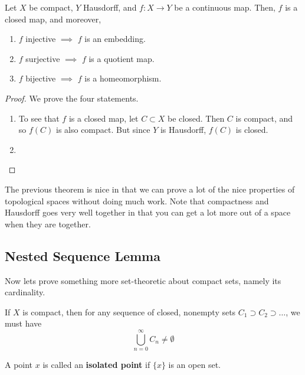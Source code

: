   \begin{theorem}
    Let $X$ be compact, $Y$ Hausdorff, and $f: X \to Y$ be a continuous map. Then, $f$ is a closed map, and moreover, 
    \begin{enumerate}
      \item $f$ injective $\implies$ $f$ is an embedding. 
      \item $f$ surjective $\implies$ $f$ is a quotient map. 
      \item $f$ bijective $\implies$ $f$ is a homeomorphism. 
    \end{enumerate}
  \end{theorem}
  \begin{proof} 
    We prove the four statements. 
    \begin{enumerate}
      \item To see that $f$ is a closed map, let $C \subset X$ be closed. Then $C$ is compact, and so $f(C)$ is also compact. But since $Y$ is Hausdorff, $f(C)$ is closed. 
      \item 
    \end{enumerate}
  \end{proof}

  The previous theorem is nice in that we can prove a lot of the nice properties of topological spaces without doing much work. Note that compactness and Hausdorff goes very well together in that you can get a lot more out of a space when they are together. 

\subsection{Nested Sequence Lemma}

  Now lets prove something more set-theoretic about compact sets, namely its cardinality. 

  \begin{lemma}
    If $X$ is compact, then for any sequence of closed, nonempty sets $C_1 \supset C_2 \supset \ldots$, we must have 
    \begin{equation}
      \bigcup_{n=0}^{\infty} C_n \neq \emptyset
    \end{equation}
  \end{lemma}

  \begin{definition}
    A point $x$ is called an \textbf{isolated point} if $\{x\}$ is an open set. 
  \end{definition}

